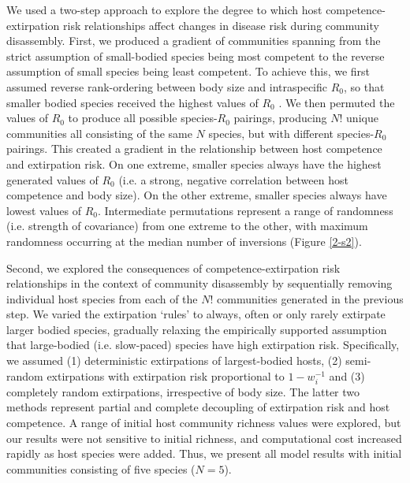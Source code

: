 We used a two-step approach to explore the degree to which host competence-extirpation risk relationships affect changes in disease risk during community disassembly.
First, we produced a gradient of communities spanning from the strict assumption of small-bodied species being most competent to the reverse assumption of small species being least competent. To achieve this, we first assumed reverse rank-ordering between body size and intraspecific $R_0$, so that smaller bodied species received the highest values of $R_0$ \citep{Roche2012, Roche2013}.
We then permuted the values of $R_0$ to produce all possible species-$R_0$ pairings, producing $N!$ unique communities all consisting of the same $N$ species, but with different species-$R_0$ pairings.
This created a gradient in the relationship between host competence and extirpation risk.
On one extreme, smaller species always have the highest generated values of $R_0$ (i.e. a strong, negative correlation between host competence and body size).
On the other extreme, smaller species always have lowest values of $R_0$.
Intermediate permutations represent a range of randomness (i.e. strength of covariance) from one extreme to the other, with maximum randomness occurring at the median number of inversions (Figure \ref{2-s2}).

Second, we explored the consequences of competence-extirpation risk relationships in the context of community disassembly by sequentially removing individual host species from each of the $N!$ communities generated in the previous step.
We varied the extirpation ‘rules’ to always, often or only rarely extirpate larger bodied species, gradually relaxing the empirically supported assumption that large-bodied (i.e. slow-paced) species have high extirpation risk.
Specifically, we assumed (1) deterministic extirpations of largest-bodied hosts, (2) semi-random extirpations with extirpation risk proportional to $1 − w_i^{-1}$ and (3) completely random extirpations, irrespective of body size.
The latter two methods represent partial and complete decoupling of extirpation risk and host competence.
A range of initial host community richness values were explored, but our results were not sensitive to initial richness, and computational cost increased rapidly as host species were added.
Thus, we present all model results with initial communities consisting of five species ($N = 5$).


